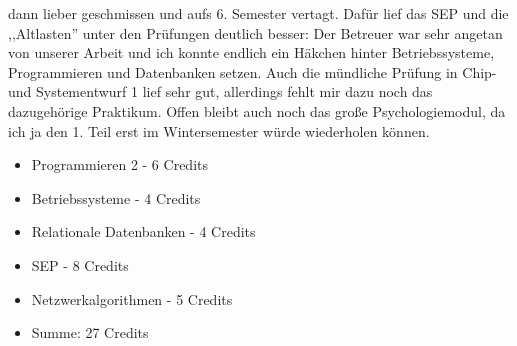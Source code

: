 dann lieber geschmissen und aufs 6. Semester vertagt. Dafür lief das
SEP und die ,,Altlasten'' unter den Prüfungen deutlich besser: Der
Betreuer war sehr angetan von unserer Arbeit und ich konnte endlich
ein Häkchen hinter Betriebssysteme, Programmieren und Datenbanken
setzen. Auch die mündliche Prüfung in Chip- und Systementwurf 1 lief
sehr gut, allerdings fehlt mir dazu noch das dazugehörige Praktikum. 
Offen bleibt  auch noch das
große Psychologiemodul, da ich ja den 1. Teil erst im Wintersemester
würde wiederholen können.
\begin{itemize}
%
 \item Programmieren 2 - 6 Credits
 \item Betriebssysteme - 4 Credits
\item Relationale Datenbanken - 4 Credits
\item SEP - 8 Credits
\item Netzwerkalgorithmen       - 5 Credits
\item Summe: 27  Credits
\end{itemize}

